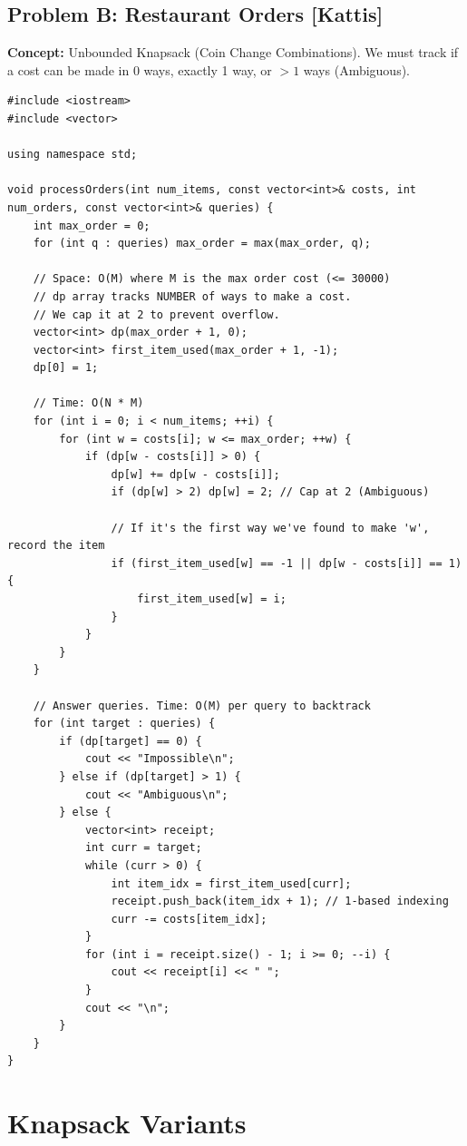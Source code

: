 \subsection{Problem B: Restaurant Orders [Kattis]}
\textbf{Concept:} Unbounded Knapsack (Coin Change Combinations). We must track if a cost can be made in 0 ways, exactly 1 way, or $>1$ ways (Ambiguous).

\begin{lstlisting}
#include <iostream>
#include <vector>

using namespace std;

void processOrders(int num_items, const vector<int>& costs, int num_orders, const vector<int>& queries) {
    int max_order = 0;
    for (int q : queries) max_order = max(max_order, q);
    
    // Space: O(M) where M is the max order cost (<= 30000)
    // dp array tracks NUMBER of ways to make a cost.
    // We cap it at 2 to prevent overflow.
    vector<int> dp(max_order + 1, 0);
    vector<int> first_item_used(max_order + 1, -1);
    dp[0] = 1;
    
    // Time: O(N * M)
    for (int i = 0; i < num_items; ++i) {
        for (int w = costs[i]; w <= max_order; ++w) {
            if (dp[w - costs[i]] > 0) {
                dp[w] += dp[w - costs[i]];
                if (dp[w] > 2) dp[w] = 2; // Cap at 2 (Ambiguous)
                
                // If it's the first way we've found to make 'w', record the item
                if (first_item_used[w] == -1 || dp[w - costs[i]] == 1) {
                    first_item_used[w] = i; 
                }
            }
        }
    }
    
    // Answer queries. Time: O(M) per query to backtrack
    for (int target : queries) {
        if (dp[target] == 0) {
            cout << "Impossible\n";
        } else if (dp[target] > 1) {
            cout << "Ambiguous\n";
        } else {
            vector<int> receipt;
            int curr = target;
            while (curr > 0) {
                int item_idx = first_item_used[curr];
                receipt.push_back(item_idx + 1); // 1-based indexing
                curr -= costs[item_idx];
            }
            for (int i = receipt.size() - 1; i >= 0; --i) {
                cout << receipt[i] << " ";
            }
            cout << "\n";
        }
    }
}
\end{lstlisting}


\section{Knapsack Variants}

